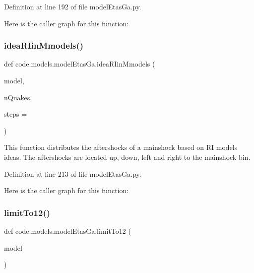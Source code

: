 Definition at line 192 of file model\+Etas\+Ga.\+py.

Here is the caller graph for this function\+:
\mbox{\label{namespacecode_1_1models_1_1model_etas_ga_ae9c1d72d1b1daea004e956e14b12ae0e}} 
\subsubsection{\texorpdfstring{idea\+R\+Iin\+Mmodels()}{ideaRIinMmodels()}}
{\footnotesize\ttfamily def code.\+models.\+model\+Etas\+Ga.\+idea\+R\+Iin\+Mmodels (\begin{DoxyParamCaption}\item[{}]{model,  }\item[{}]{n\+Quakes,  }\item[{}]{steps = {} }\end{DoxyParamCaption})}

\begin{DoxyVerb}This function distributes the aftershocks of a mainshock based on RI models ideas.
The aftershocks are located up, down, left and right to the mainshock bin.
\end{DoxyVerb}
 

Definition at line 213 of file model\+Etas\+Ga.\+py.

Here is the caller graph for this function\+:
\mbox{\label{namespacecode_1_1models_1_1model_etas_ga_a600e69e5c6d90c92ad6406ede3f60318}} 
\subsubsection{\texorpdfstring{limit\+To12()}{limitTo12()}}
{\footnotesize\ttfamily def code.\+models.\+model\+Etas\+Ga.\+limit\+To12 (\begin{DoxyParamCaption}\item[{}]{model }\end{DoxyParamCaption})}

